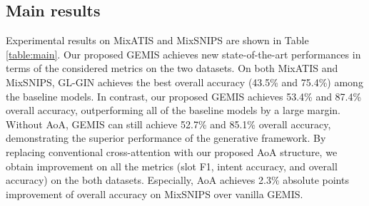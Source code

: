 \documentclass[11pt]{article}
\begin{document}
\begin{table}[ht]
\centering
\caption{Main results on our constructed MultiATIS and MultiSNIPS.}
\label{table:new}
\end{table}


\subsection{Main results}
Experimental results on MixATIS and MixSNIPS are shown in Table \ref{table:main}. Our proposed GEMIS achieves new state-of-the-art performances in terms of the considered metrics on the two datasets. On both MixATIS and MixSNIPS, GL-GIN achieves the best overall accuracy (43.5\% and 75.4\%) among the baseline models. In contrast, our proposed GEMIS achieves 53.4\% and 87.4\% overall accuracy, outperforming all of the baseline models by a large margin. Without AoA, GEMIS can still achieve 52.7\% and 85.1\% overall accuracy, demonstrating the superior performance of the generative framework. By replacing conventional cross-attention with our proposed AoA structure, we obtain improvement on all the metrics (slot F1, intent accuracy, and overall accuracy) on the both datasets. Especially, AoA achieves 2.3\% absolute points improvement of overall accuracy on MixSNIPS over vanilla GEMIS.
\end{document}
